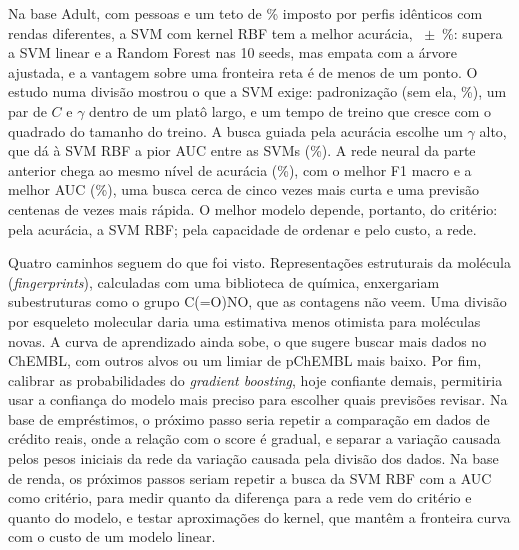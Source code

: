 Na base Adult, com \svLinhas{} pessoas e um teto de \svTeto\% imposto por perfis idênticos com rendas diferentes, a SVM com kernel RBF tem a melhor acurácia, \svRBFAcc~$\pm$~\svRBFSd\%: supera a SVM linear e a Random Forest nas 10 seeds, mas empata com a árvore ajustada, e a vantagem sobre uma fronteira reta é de menos de um ponto. O estudo numa divisão mostrou o que a SVM exige: padronização (sem ela, \svPadSem\%), um par de $C$ e $\gamma$ dentro de um platô largo, e um tempo de treino que cresce com o quadrado do tamanho do treino. A busca guiada pela acurácia escolhe um $\gamma$ alto, que dá à SVM RBF a pior AUC entre as SVMs (\svRBFAuc\%). A rede neural da parte anterior chega ao mesmo nível de acurácia (\svRedeAcc\%), com o melhor F1 macro e a melhor AUC (\svRedeAuc\%), uma busca cerca de cinco vezes mais curta e uma previsão centenas de vezes mais rápida. O melhor modelo depende, portanto, do critério: pela acurácia, a SVM RBF; pela capacidade de ordenar e pelo custo, a rede.

Quatro caminhos seguem do que foi visto. Representações estruturais da molécula (\emph{fingerprints}), calculadas com uma biblioteca de química, enxergariam subestruturas como o grupo C(=O)NO, que as contagens não veem. Uma divisão por esqueleto molecular daria uma estimativa menos otimista para moléculas novas. A curva de aprendizado ainda sobe, o que sugere buscar mais dados no ChEMBL, com outros alvos ou um limiar de pChEMBL mais baixo. Por fim, calibrar as probabilidades do \emph{gradient boosting}, hoje confiante demais, permitiria usar a confiança do modelo mais preciso para escolher quais previsões revisar. Na base de empréstimos, o próximo passo seria repetir a comparação em dados de crédito reais, onde a relação com o score é gradual, e separar a variação causada pelos pesos iniciais da rede da variação causada pela divisão dos dados. Na base de renda, os próximos passos seriam repetir a busca da SVM RBF com a AUC como critério, para medir quanto da diferença para a rede vem do critério e quanto do modelo, e testar aproximações do kernel, que mantêm a fronteira curva com o custo de um modelo linear.
